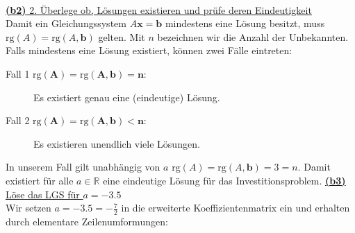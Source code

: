 \ \\
\underline{\textbf{(b2)} 2. Überlege ob, Lösungen existieren und prüfe deren Eindeutigkeit}\\
Damit ein Gleichungssystem $ A \mathbf{x} = \mathbf{b} $ mindestens eine Lösung besitzt, muss $ \mathrm{rg}(A) = \mathrm{rg}( A,\mathbf{b} ) $ gelten.
Mit $n$ bezeichnen wir die Anzahl der Unbekannten.
Falls mindestens eine Lösung existiert, können zwei Fälle eintreten:
\begin{description}
	\item[Fall 1 $\mathbf{\mathrm{rg}(A) = \mathrm{rg}(A,b) = n}$:] Es existiert genau eine (eindeutige) Lösung.
	\item[Fall 2 $\mathbf{\mathrm{rg}(A) = \mathrm{rg}(A,b) < n }$:] Es existieren unendlich viele Lösungen.
\end{description}
In unserem Fall gilt unabhängig von $a$ $\mathrm{rg}(A) = \mathrm{rg}(A,\mathbf{b}) = 3 = n$. Damit existiert für alle $a \in \mathbb{R}$ eine eindeutige Lösung für das Investitionsproblem.
\newpage
\underline{\textbf{(b3)} Löse das LGS für $a=-3.5 $}\\
Wir setzen $a = -3.5 = - \frac{7	}{2}$ in die erweiterte Koeffizientenmatrix ein und erhalten durch elementare Zeilenumformungen:
